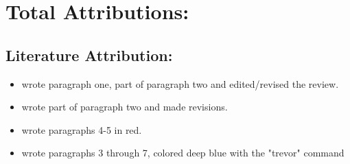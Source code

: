 





\section{Total Attributions:}
\subsection{Literature Attribution:}
\begin{itemize}
    \item {} wrote paragraph one, part of paragraph two and edited/revised the review.
    \item {} wrote part of paragraph two and made revisions.
    \item {} wrote paragraphs 4-5 in red.
    \item {} wrote paragraphs 3 through 7, colored deep blue with the "trevor{}" command
\end{itemize}

